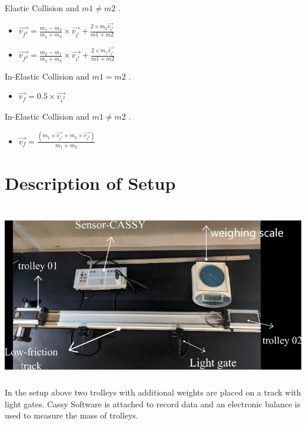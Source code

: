 Elastic Collision and $m1 \neq m2$ . 
\begin{center}
    \begin{itemize}
        \item $ \vec{v_{f^1}} = \frac{m_1 - m_2}{m_1+m_2} \times \vec{v_{i^i}} +  \frac{2 \times m_2 \vec{v_{i^2}}}{m1+m2}$
        \item $ \vec{v_{f^2}} = \frac{m_2 - m_1}{m_1+m_2} \times \vec{v_{i^1}} +  \frac{2 \times m_1 \vec{v_{i^1}}}{m1+m2}$
    \end{itemize}
\end{center}
In-Elastic Collision and $m1 = m2$ . 
\begin{center}
    \begin{itemize}
        \item $ \vec{v_{f}} = 0.5 \times \vec{v_{i^2}}$
    \end{itemize}
\end{center}
In-Elastic Collision and $m1 \neq m2$ . 
\begin{center}
    \begin{itemize}
        \item $ \vec{v_{f}} = \frac{(m_1 \times \vec{v_{i^1}} +  m_2 \times \vec{v_{i^2}})}{m_1 + m_2}$
    \end{itemize}
\end{center}

\section{Description of Setup}
\includegraphics[width=15cm, height=8cm]{figures/exp5fig.jpeg} \\
In the setup above two trolleys with additional weights are placed on a track with light gates. Cassy Software is attached to record data and an electronic balance is used to measure the mass of trolleys.  

